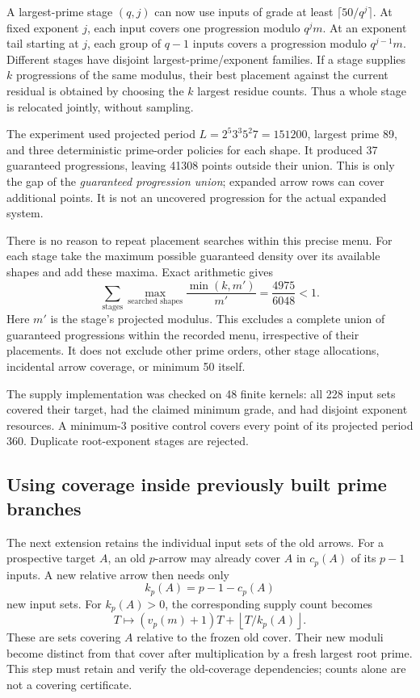 \documentclass[11pt]{article}
\begin{document}
A largest-prime stage $(q,j)$ can now use inputs of grade at least
$\lceil50/q^j\rceil$. At fixed exponent $j$, each input covers one
progression modulo $q^jm$. At an exponent tail starting at $j$, each group
of $q-1$ inputs covers a progression modulo $q^{j-1}m$. Different stages
have disjoint largest-prime/exponent families. If a stage supplies $k$
progressions of the same modulus, their best placement against the current
residual is obtained by choosing the $k$ largest residue counts. Thus a
whole stage is relocated jointly, without sampling.

The experiment used projected period
$L=2^5 3^3 5^2 7=151200$, largest prime 89, and three deterministic
prime-order policies for each shape. It produced 37 guaranteed progressions,
leaving 41308 points outside their union. This is only the gap of the
\emph{guaranteed progression union}; expanded arrow rows can cover additional
points. It is not an uncovered progression for the actual expanded system.

There is no reason to repeat placement searches within this precise menu.
For each stage take the maximum possible guaranteed density over its
available shapes and add these maxima. Exact arithmetic gives
\[
 \sum_{\text{stages}}\max_{\text{searched shapes}}\frac{\min(k,m')}{m'}
 =\frac{4975}{6048}<1.
\]
Here $m'$ is the stage's projected modulus. This excludes a complete union
of guaranteed progressions within the recorded menu, irrespective of their
placements. It does not exclude other prime orders, other stage allocations,
incidental arrow coverage, or minimum 50 itself.

The supply implementation was checked on 48 finite kernels: all 228 input
sets covered their target, had the claimed minimum grade, and had disjoint
exponent resources. A minimum-3 positive control covers every point of its
projected period 360. Duplicate root-exponent stages are rejected.

\subsection{Using coverage inside previously built prime branches}
The next extension retains the individual input sets of the old arrows.
For a prospective target $A$, an old $p$-arrow may already cover $A$ in
$c_p(A)$ of its $p-1$ inputs. A new relative arrow then needs only
\[
 k_p(A)=p-1-c_p(A)
\]
new input sets. For $k_p(A)>0$, the corresponding supply count becomes
\[
 T\longmapsto(v_p(m)+1)T+\left\lfloor T/k_p(A)\right\rfloor.
\]
These are sets covering $A$ relative to the frozen old cover. Their new
moduli become distinct from that cover after multiplication by a fresh
largest root prime. This step must retain and verify the old-coverage
dependencies; counts alone are not a covering certificate.
\end{document}
